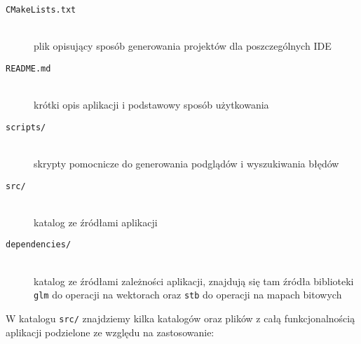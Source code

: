 \documentclass[../main.tex]{subfiles}
\begin{document}
\begin{description}
    \item[\texttt{CMakeLists.txt}] \hfill\\ 
    plik opisujący sposób generowania projektów dla poszczególnych IDE 
    
    \item[\texttt{README.md}] \hfill\\ 
    krótki opis aplikacji i podstawowy sposób użytkowania 
    
    \item[\texttt{scripts/}] \hfill\\ 
    skrypty pomocnicze do generowania podglądów i wyszukiwania błędów
    
    \item[\texttt{src/}] \hfill\\ 
    katalog ze źródłami aplikacji
    
    \item[\texttt{dependencies/}] \hfill\\ 
    katalog ze źródłami zależności aplikacji, znajdują się tam źródła biblioteki \texttt{glm} \cite{GLMProject} do operacji na wektorach oraz \texttt{stb} \cite{STBProject} do operacji na mapach bitowych
\end{description}

\noindent W katalogu \texttt{src/} znajdziemy kilka katalogów oraz plików z całą funkcjonalnością aplikacji podzielone ze względu na zastosowanie:
\end{document}

